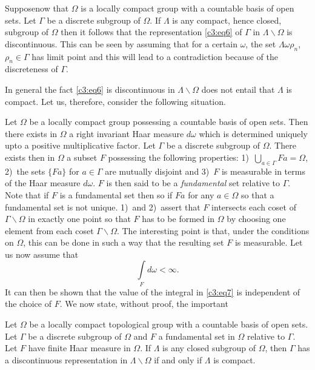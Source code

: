 Suppose\pageoriginale now that $\Omega$ is a locally compact group
with a countable basis of open sets. Let $\Gamma$ be a discrete
subgroup of $\Omega$. If $\Lambda$ is any compact, hence closed,
subgroup of $\Omega$ then it follows that the representation \eqref{c3:eq6}
of $\Gamma$ in $\Lambda\backslash\Omega$ is discontinuous. This can be
seen by assuming that for a certain $\omega$, the set
$\Lambda\omega\rho_{n}$, $\rho_{n}\in\Gamma$ has limit point and this
will lead to a contradiction because of the discreteness of $\Gamma$.

In general the fact \eqref{c3:eq6} is discontinuous in
$\Lambda\backslash\Omega$ does not entail that $\Lambda$ is
compact. Let us, therefore, consider the following situation.

Let $\Omega$ be a locally compact group possessing a countable basis
of open sets. Then there exists in $\Omega$ a right invariant Haar
measure $d\omega$ which is determined uniquely upto a positive
multiplicative factor. Let $\Gamma$ be a discrete subgroup of
$\Omega$. There exists then in $\Omega$ a subset $F$ possessing the
following properties: 1)~$\bigcup\limits_{a\in\Gamma}Fa=\Omega$,
2)~the sets $\{Fa\}$ for $a\in\Gamma$ are mutually disjoint and 3)~$F$
is measurable in terms of the Haar measure $d\omega$. $F$ is then said
to be a {\em fundamental} set relative to $\Gamma$. Note that if $F$
is a fundamental set then so if $Fa$ for any $a\in\Omega$ so that a
fundamental set is not unique. 1)~and 2)~assert that $F$ intersects
each coset of $\Gamma\backslash\Omega$ in exactly one point so that
$F$ has to be formed in $\Omega$ by choosing one element from each
coset $\Gamma\backslash\Omega$. The interesting point is that, under
the conditions on $\Omega$, this can be done in such a way that the
resulting set $F$ is measurable. Let us now assume that 
\begin{equation*}
\int\limits_{F}d\omega<\infty.\tag{7}\label{c3:eq7}
\end{equation*}\pageoriginale
It can then be shown that the value of the integral in \eqref{c3:eq7} is
independent of the choice of $F$. We now state, without proof, the
important

\setcounter{thm}{0}
\begin{thm}\label{chap3:thm1}
Let $\Omega$ be a locally compact topological group with a countable
basis of open sets. Let $\Gamma$ be a discrete subgroup of $\Omega$
and $F$ a fundamental set in $\Omega$ relative to $\Gamma$. Let $F$
have finite Haar measure in $\Omega$. If $\Lambda$ is any closed
subgroup of $\Omega$, then $\Gamma$ has a discontinuous representation
in $\Lambda\backslash\Omega$ if and only if $\Lambda$ is compact.
\end{thm}

